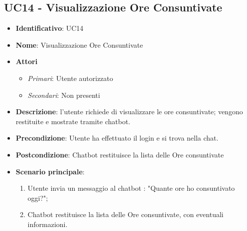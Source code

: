 \subsection{UC14 - Visualizzazione Ore Consuntivate }
\begin{itemize}
	\item \textbf{Identificativo}: UC14
	\item \textbf{Nome}: Visualizzazione Ore Consuntivate
	\item \textbf{Attori}
	\begin{itemize} 
		\item \textit{Primari}: Utente autorizzato
		\item \textit{Secondari}: Non presenti
	\end{itemize}
	\item \textbf{Descrizione}: l'utente richiede di visualizzare le ore consuntivate; vengono restituite e mostrate tramite chatbot.
	\item \textbf{Precondizione}: Utente ha effettuato il login e si trova nella chat.
	\item \textbf{Postcondizione}: Chatbot restituisce la lista delle Ore consuntivate
	\item \textbf{Scenario principale}:  
		\begin{enumerate}
			\item Utente invia un messaggio al chatbot : "Quante ore ho consuntivato oggi?";
			\item Chatbot restituisce la lista delle Ore consuntivate, con eventuali informazioni.
		\end{enumerate}
\end{itemize}